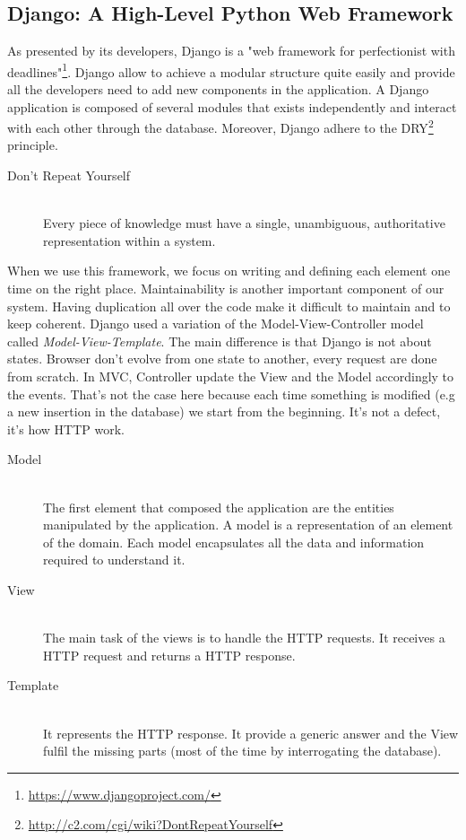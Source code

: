 \subsection{Django: A High-Level Python Web Framework}
As presented by its developers, Django is a "web framework for perfectionist with deadlines"\footnote{\url{https://www.djangoproject.com/}}. Django allow to achieve a modular structure quite easily and provide all the developers need to add new components in the application. A Django application is composed of several modules that exists independently and interact with each other through the database.
Moreover, Django adhere to the DRY\footnote{\url{http://c2.com/cgi/wiki?DontRepeatYourself}} principle.
\begin{description}
  \item[Don't Repeat Yourself] \hfill \\
  Every piece of knowledge must have a single, unambiguous, authoritative representation within a system.
\end{description}
When we use this framework, we focus on writing and defining each element one time on the right place. Maintainability is another important component of our system. Having duplication all over the code make it difficult to maintain and to keep coherent.
Django used a variation of the Model-View-Controller model called \emph{Model-View-Template}\cite{mvt}. The main difference is that Django is not about states. Browser don't evolve from one state to another, every request are done from scratch. In MVC, Controller update the View and the Model accordingly to the events. That's not the case here because each time something is modified (e.g a new insertion in the database) we start from the beginning. It's not a defect, it's how HTTP work.

\begin{description}
\item[Model] \hfill \\
The first element that composed the application are the entities manipulated by the application. A model is a representation of an element of the domain. Each model encapsulates all the data and information required to understand it.
\item[View] \hfill \\
The main task of the views is to handle the HTTP requests. It receives a HTTP request and returns a HTTP response.
\item[Template] \hfill \\
It represents the HTTP response. It provide a generic answer and the View fulfil the missing parts (most of the time by interrogating the database).
\end{description}

